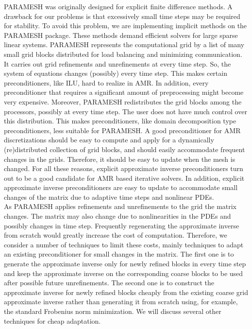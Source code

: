 \documentclass{report}
\begin{document}
PARAMESH was originally designed for explicit finite difference
methods. A drawback for our problems is that excessively small
time steps may be required for stability. To avoid this problem,
we are implementing implicit methods on the PARAMESH package.
These methods demand efficient solvers for large sparse linear
systems. PARAMESH represents the computational grid by a list of
many small grid blocks distributed for load balancing and
minimizing communication. It carries out grid refinements and
unrefinements at every time step. So, the system of equations
changes (possibly) every time step. This makes certain
preconditioners, like ILU, hard to realize in AMR. In addition,
every preconditioner that requires a significant amount of
preprocessing might become very expensive. Moreover, PARAMESH
redistributes the grid blocks among the processors, possibly at
every time step. The user does not have much control over this
distribution. This makes preconditioners, like domain
decomposition type preconditioners, less suitable for PARAMESH. A good
preconditioner for AMR discretizations should be easy to
compute and apply for a dynamically (re)distributed collection of grid
blocks, and should easily accommodate frequent changes in the grids.
Therefore, it should be easy to update when the mesh is changed. For all
these reasons, explicit approximate inverse preconditioners turn out to
be a good candidate for AMR based iterative solvers. In addition,
explicit approximate inverse preconditioners are easy to update to
accommodate small changes of the matrix due to adaptive time steps and
nonlinear PDEs.\\

As PARAMESH applies refinements and unrefinements to the grid the matrix
changes. The matrix may also change due to nonlinearities in the PDEs and
possibly changes in time step. Frequently regenerating the approximate
inverse from scratch would greatly increase the cost of computation.
Therefore, we consider a number of techniques to limit these costs,
mainly techniques to adapt an existing preconditioner for small changes
in the matrix. The first one is to generate the approximate inverse only
for newly refined blocks in every time step and keep the approximate
inverse on the corresponding coarse blocks to be used after possible
future unrefinements. The second one is to construct the approximate
inverse for newly refined blocks cheaply from the existing coarse grid
approximate inverse rather than generating it from scratch using, for
example, the standard Frobenius norm minimization. We will discuss
several other techniques
for cheap adaptation.\\
\end{document}
